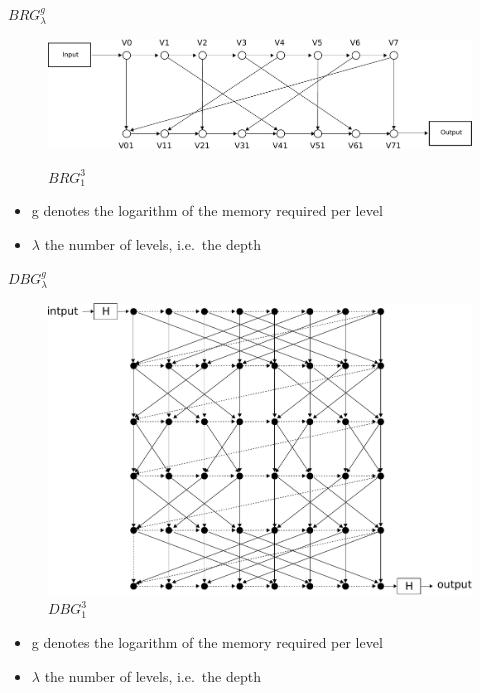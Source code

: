 \documentclass[11pt,aspectratio=169]{beamer}
\begin{document}
\begin{frame}{$BRG^g_\lambda$}
  \begin{minipage}[H]{0.48\linewidth}
    \begin{figure}
      \includegraphics[width=\textwidth]{images/brg_3-eps-converted-to.pdf}\\
        \caption{$BRG^3_1$}
    \end{figure}
  \end{minipage}
  \hfill%
  \begin{minipage}[H]{0.48\linewidth}
    \begin{itemize}
      \item g denotes the logarithm of the memory required per level
      \item $\lambda$ the number of levels, i.e.\ the depth
    \end{itemize}
  \end{minipage}
\end{frame}

\begin{frame}{$DBG^g_\lambda$}
  \begin{minipage}[H]{0.48\linewidth}
    \begin{figure}
      \includegraphics[width=\textwidth]{images/superconcentrator-nl-eps-converted-to.pdf}
      \caption{$DBG^3_1$}
    \end{figure}
  \end{minipage}
  \hfill%
  \begin{minipage}[H]{0.48\linewidth}
    \begin{itemize}
      \item g denotes the logarithm of the memory required per level
      \item $\lambda$ the number of levels, i.e.\ the depth
    \end{itemize}
  \end{minipage}
\end{frame}
\end{document}
